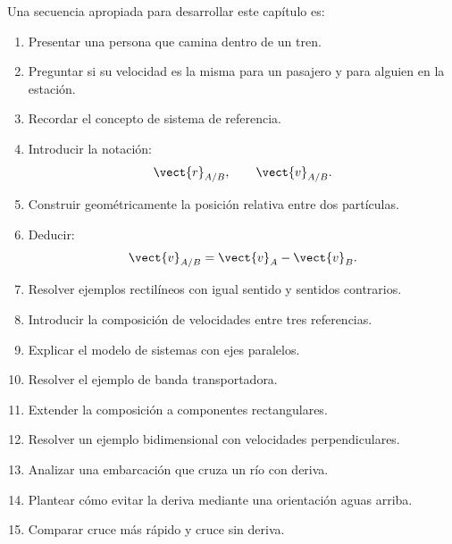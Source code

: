 \begin{notapedagogica}

Una secuencia apropiada para desarrollar
este capítulo es:

\begin{enumerate}

    \item Presentar una persona que camina
    dentro de un tren.

    \item Preguntar si su velocidad es la misma
    para un pasajero y para alguien en la estación.

    \item Recordar el concepto de sistema
    de referencia.

    \item Introducir la notación:
    \[
    \vect{r}_{A/B},
    \qquad
    \vect{v}_{A/B}.
    \]

    \item Construir geométricamente
    la posición relativa entre dos partículas.

    \item Deducir:
    \[
    \vect{v}_{A/B}
    =
    \vect{v}_A-\vect{v}_B.
    \]

    \item Resolver ejemplos rectilíneos
    con igual sentido y sentidos contrarios.

    \item Introducir la composición
    de velocidades entre tres referencias.

    \item Explicar el modelo de sistemas
    con ejes paralelos.

    \item Resolver el ejemplo de banda
    transportadora.

    \item Extender la composición
    a componentes rectangulares.

    \item Resolver un ejemplo bidimensional
    con velocidades perpendiculares.

    \item Analizar una embarcación
    que cruza un río con deriva.

    \item Plantear cómo evitar la deriva
    mediante una orientación aguas arriba.

    \item Comparar cruce más rápido
    y cruce sin deriva.


\end{enumerate}
\end{notapedagogica}
